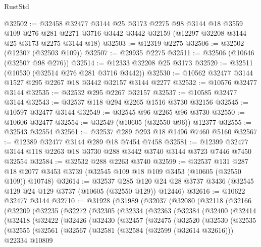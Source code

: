 \begin{lexlean}{RustStd}
\begin{coremodule}
@32502 := @32458
    @32477
    @3144
    @25
    @3173
    @2275
    @98
    @3144
    @18
    @3559
    @109
    @276
    @281
    @2271
    @3716
    @3442
    @3442
    @32159
    (@12297 @32208 @3144 @25 @3173 @2275 @3144 @18)
@32503 := @12319 @2275
@32506 := @32502 (@12307 (@32503 @109))
@32507 := @29935 @2275
@32511 := @32506 (@10646 (@32507 @98 @276))
@32514 := @12333 @32208 @25 @3173
@32520 := @32511 (@10530 (@32514 @276 @281 @3716 @3442))
@32530 := @10562 @32477 @3144 @1527 @295 @2267 @18 @3442 @32157 @3144 @2277
@32532 := @10576 @32477 @3144
@32535 := @32532 @295 @2267 @32157
@32537 := @10585 @32477 @3144
@32543 := @32537 @118 @294 @2265 @1516 @3730 @32156
@32545 := @10597 @32477 @3144
@32549 := @32545 @96 @2265 @96 @3730
@32550 := @10606 @32477
@32554 := @32549 (@10605 (@32550 @96)) @12377
@32555 := @32543 @32554
@32561 := @32537 @289 @293 @18 @1496 @7460 @5160
@32567 := @12389 @32477 @3144 @289 @18 @7454 @7458
@32581 := @12399 @32477 @3144 @118 @2263 @18 @3730 @288 @3442 @3740 @3144 @3723 @7446 @7450 @32554
@32584 := @32532 @288 @2263 @3740
@32599 := @32537
    @131
    @287
    @18
    @2077
    @3453
    @3739
    (@32545 @109 @18 @109 @3453 (@10605 (@32550 @109)) @10748)
@32614 := @32537
    @285
    @120
    @24
    @28
    @3737
    @3436
    (@32545 @129 @24 @129 @3737 (@10605 (@32550 @129)) @12446)
@32616 := @10622 @32477 @3144
@32710 := @31928
    (@31989
      (@32037
        (@32080
          (@32118
            (@32166
              (@32209
                (@32235
                  (@32272
                    (@32305
                      (@32334
                        (@32363
                          (@32384
                            (@32400
                              (@32414
                                (@32418
                                  (@32422
                                    (@32426
                                      (@32430
                                        (@32457
                                          (@32475
                                            (@32520
                                              (@32530
                                                (@32535
                                                  (@32555
                                                    (@32561
                                                      (@32567
                                                        (@32581
                                                          (@32584 (@32599 (@32614 @32616)))
                                                          @22334
                                                          @10809

\end{coremodule}
\end{lexlean}
